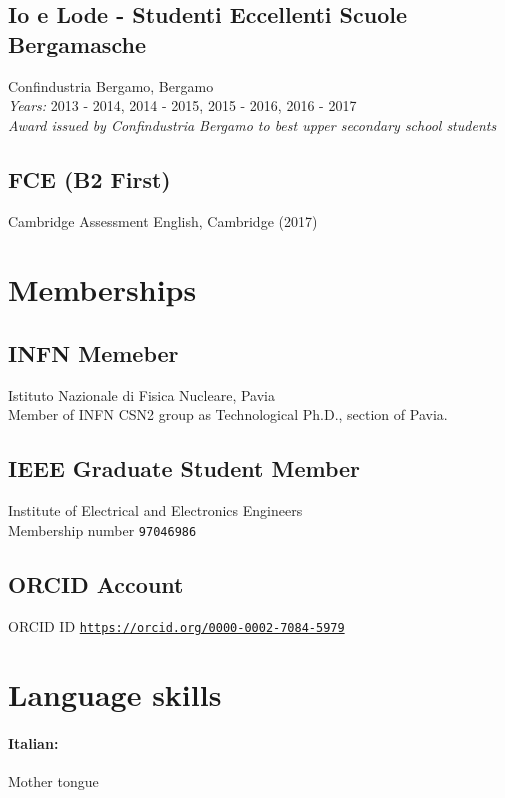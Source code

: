 \documentclass[11pt]{article}
\begin{document}
\subsection*{Io e Lode - Studenti Eccellenti Scuole Bergamasche}
Confindustria Bergamo, Bergamo\\
\textit{Years:} 2013 - 2014, 2014 - 2015, 2015 - 2016, 2016 - 2017\\
\textit{Award issued by Confindustria Bergamo to best upper secondary school students}

\subsection*{FCE (B2 First)}
Cambridge Assessment English, Cambridge (2017)

\bigskip
\section*{Memberships}

\subsection*{INFN Memeber}
Istituto Nazionale di Fisica Nucleare, Pavia\\
Member of INFN CSN2 group as Technological Ph.D., section of Pavia.

\subsection*{IEEE Graduate Student Member}
Institute of Electrical and Electronics Engineers\\
Membership number \texttt{97046986}

\subsection*{ORCID Account}
ORCID ID \href{https://orcid.org/0000-0002-7084-5979}{\texttt{https://orcid.org/0000-0002-7084-5979}}

\bigskip
\section*{Language skills}
\paragraph{\hspace{6pt}Italian:}Mother tongue
\vspace{-0.5cm}
\end{document}
